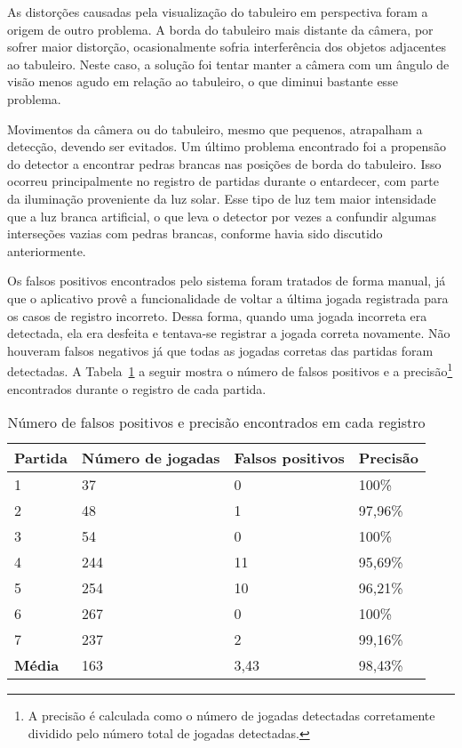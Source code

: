 As distorções causadas pela visualização do tabuleiro em perspectiva foram a origem de outro problema. A borda do tabuleiro mais distante da câmera, por sofrer maior distorção, ocasionalmente sofria interferência dos objetos adjacentes ao tabuleiro. Neste caso, a solução foi tentar manter a câmera com um ângulo de visão menos agudo em relação ao tabuleiro, o que diminui bastante esse problema. 

Movimentos da câmera ou do tabuleiro, mesmo que pequenos, atrapalham a detecção, devendo ser evitados. Um último problema encontrado foi a propensão do detector a encontrar pedras brancas nas posições de borda do tabuleiro. Isso ocorreu principalmente no registro de partidas durante o entardecer, com parte da iluminação proveniente da luz solar. Esse tipo de luz tem maior intensidade que a luz branca artificial, o que leva o detector por vezes a confundir algumas interseções vazias com pedras brancas, conforme havia sido discutido anteriormente.

Os falsos positivos encontrados pelo sistema foram tratados de forma manual, já que o aplicativo provê a funcionalidade de voltar a última jogada registrada para os casos de registro incorreto. Dessa forma, quando uma jogada incorreta era detectada, ela era desfeita e tentava-se registrar a jogada correta novamente. Não houveram falsos negativos já que todas as jogadas corretas das partidas foram detectadas. A Tabela~\ref{tab:falsos-positivos} a seguir mostra o número de falsos positivos e a precisão\footnote{A precisão é calculada como o número de jogadas detectadas corretamente dividido pelo número total de jogadas detectadas.} encontrados durante o registro de cada partida.

\begin{table}[tbh]
\centering
\label{tab:falsos-positivos}
\begin{tabular}{l|l|l|l}
\textbf{Partida} & \textbf{Número de jogadas} & \textbf{Falsos positivos} & \textbf{Precisão}\\
\hline
1 &  37 &  0 &   100\%\\    %
\hline
2 &  48 &  1 & 97,96\%\\    %
\hline
3 &  54 &  0 &   100\%\\    %
\hline
4 & 244 & 11 & 95,69\%\\    %
\hline
5 & 254 & 10 & 96,21\%\\    %
\hline
6 & 267 &  0 &   100\%\\    %
\hline
7 & 237 &  2 & 99,16\%\\    %
\hline
\textbf{Média} & 163 & 3,43 & 98,43\%\\
\end{tabular}
\caption{Número de falsos positivos e precisão encontrados em cada registro}
\end{table}

